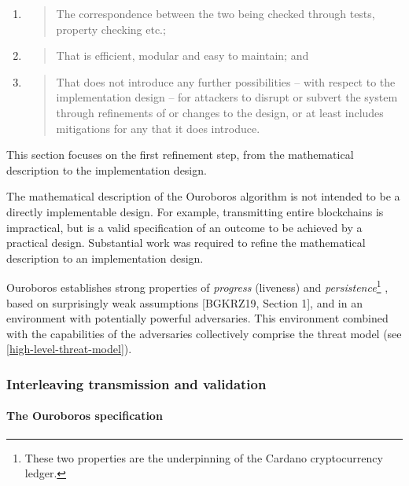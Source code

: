 \documentclass[11pt,a4paper]{article}
\begin{document}
\begin{enumerate}
  \begin{enumerate}
  \def\labelenumii{\alph{enumii}.}
  \setcounter{enumii}{3}
  \item
    \begin{quote}
    The correspondence between the two being checked through tests,
    property checking etc.;
    \end{quote}
  \item
    \begin{quote}
    That is efficient, modular and easy to maintain; and
    \end{quote}
  \item
    \begin{quote}
    That does not introduce any further possibilities -- with respect to
    the implementation design -- for attackers to disrupt or subvert the
    system through refinements of or changes to the design, or at least
    includes mitigations for any that it does introduce.
    \end{quote}
  \end{enumerate}
\end{enumerate}

This section focuses on the first refinement step, from the mathematical
description to the implementation design.

The mathematical description of the Ouroboros algorithm is not intended
to be a directly implementable design. For example, transmitting entire
blockchains is impractical, but is a valid specification of an outcome
to be achieved by a practical design. Substantial work was required to
refine the mathematical description to an implementation design.

Ouroboros establishes strong properties of \emph{progress} (liveness)
and \emph{persistence}\footnote{These two properties are the
  underpinning of the Cardano cryptocurrency ledger.} , based on
surprisingly weak assumptions {[}BGKRZ19, Section 1{]}, and in an
environment with potentially powerful adversaries. This environment
combined with the capabilities of the adversaries collectively comprise
the threat model (see \cref{high-level-threat-model}).

\subsubsection{Interleaving transmission and validation}
\label{interleaving-transmission-and-validation}

\paragraph{The Ouroboros specification}
\label{the-ouroboros-specification}
\end{document}
